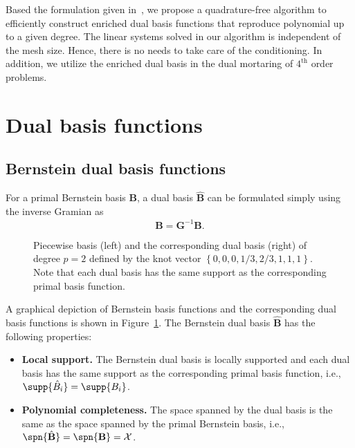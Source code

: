 Based the formulation given in~\cite{oswald2001polynomial}, we propose a quadrature-free algorithm to efficiently construct enriched dual basis functions that reproduce polynomial up to a given degree. The linear systems solved in our algorithm is independent of the mesh size. Hence, there is no needs to take care of the conditioning. In addition, we utilize the enriched dual basis in the dual mortaring of $4^\text{th}$ order problems. \par

\section{Dual basis functions}

\subsection{Bernstein dual basis functions}
For a primal Bernstein basis $\mathbf{B}$, a dual basis $\hat{\mathbf{B}}$ can be formulated simply using the inverse Gramian as
\begin{equation}
	\hat{\mathbf{B}} = \mathbf{G}^{-1}\mathbf{B}.\label{eq:global_dual}
\end{equation}

\begin{figure}
    \centering
    \begin{subfigure}{.48\linewidth}
        \center
        
    \end{subfigure}
    \begin{subfigure}{.48\linewidth}
        \center
        
    \end{subfigure}
	\caption{Piecewise \Bezier basis (left) and the corresponding dual basis (right) of degree $p=2$ defined by the knot vector $\left\{0,0,0,1/3,2/3,1,1,1\right\}$. Note that each dual basis has the same support as the corresponding primal basis function.}
	\label{fig:bezier_and_its_dual}
\end{figure}
A graphical depiction of Bernstein basis functions and the corresponding dual basis functions is shown in Figure~\ref{fig:bezier_and_its_dual}. The Bernstein dual basis $\hat{\mathbf{B}}$ has the following properties:
\begin{itemize}
	\item{\textbf{Local support.}} The Bernstein dual basis is locally supported and each dual basis has the same support as the corresponding primal basis function, i.e., $\supp{\hat{B}_i}=\supp{{B}_i}$.
	\item{\textbf{Polynomial completeness.}} The space spanned by the dual basis is the same as the space spanned by the primal Bernstein basis, i.e., $\spn\{\hat{\mathbf{B}}\}=\spn\{\mathbf{B}\}=\mathcal{X}$.
\end{itemize}

